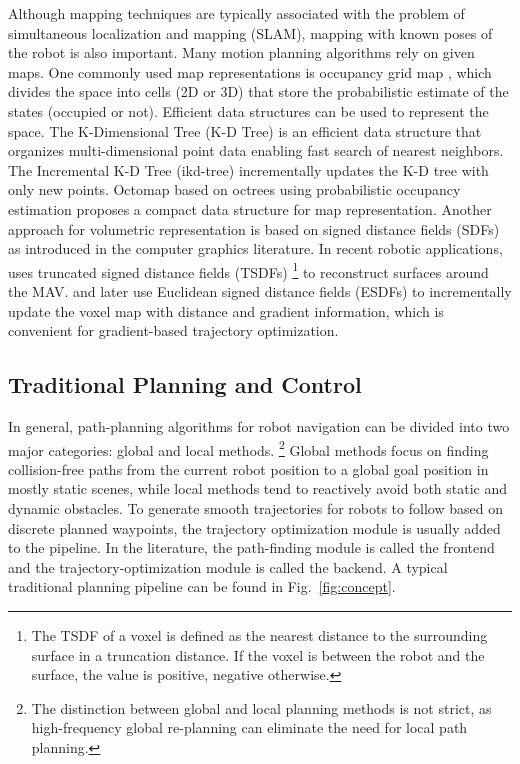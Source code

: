 \documentclass[letterpaper,journal,twoside]{IEEEtran}
\begin{document}
Although mapping techniques are typically associated 
with the problem of
simultaneous localization and mapping (SLAM), mapping with
known poses of the robot is also important. 
Many motion planning algorithms rely on given maps. 
One commonly used map representations is occupancy 
grid map \cite{elfes2013occupancy}, which divides the space
into cells (2D or 3D) that store the probabilistic estimate of the 
states (occupied or not).
Efficient data structures can be used to 
represent the space. 
The K-Dimensional Tree (K-D Tree) is an efficient data
structure that organizes multi-dimensional point data 
\cite{bentley1975multidimensional}
enabling fast search of nearest neighbors.
The Incremental K-D Tree (ikd-tree) \cite{cai2021ikd} 
incrementally updates the K-D tree with only new points.
Octomap \cite{wurm2010octomap} based on octrees using 
probabilistic occupancy estimation proposes a compact 
data structure for map representation.
Another approach for volumetric representation is based on 
signed distance fields (SDFs) \cite{curless1996volumetric}
as introduced in the computer graphics literature.
In recent robotic applications, \cite{lin2018autonomous} uses
truncated signed distance fields (TSDFs)
\footnote{The TSDF of a voxel is defined as the nearest 
distance to the surrounding surface in a truncation distance. 
If the voxel is between the robot and the surface, 
the value is positive, negative otherwise. }
to reconstruct surfaces around the MAV. 
\cite{oleynikova2017voxblox} and later \cite{han2019fiesta}
use Euclidean signed distance fields (ESDFs) to incrementally
update the voxel map with distance and gradient information, 
which is convenient for gradient-based trajectory optimization.

\subsection{Traditional Planning and Control}



In general, path-planning algorithms for robot navigation 
can be divided into two major categories: 
global and local methods.
\footnote{The distinction between global and local
planning methods is not strict, as high-frequency global 
re-planning can eliminate the need for local path planning.}  
Global methods focus on finding collision-free paths from 
the current robot position to a global goal position in mostly 
static scenes, while local methods tend to reactively 
avoid both static and dynamic obstacles. 
To generate smooth trajectories for robots to 
follow based on discrete planned waypoints, the 
trajectory optimization module is usually added to 
the pipeline. 
In the literature, the path-finding module 
is called the frontend and the 
trajectory-optimization module is called the backend. 
A typical traditional planning pipeline can be 
found in Fig.~\ref{fig:concept}.
\end{document}
